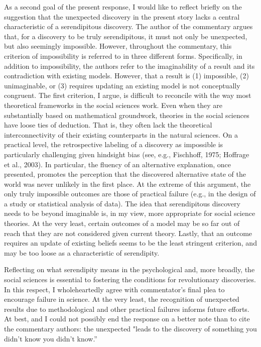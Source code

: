 \documentclass[authordate, commentary]{jote-new-article}
\begin{document}
	As a second goal of the present response, I would like to reflect briefly on the suggestion that the unexpected discovery in the present story lacks a central characteristic of a serendipitous discovery. The author of the commentary argues that, for a discovery to be truly serendipitous, it must not only be unexpected, but also seemingly impossible. However, throughout the commentary, this criterion of impossibility is referred to in three different forms. Specifically, in addition to impossibility, the authors refer to the imaginability of a result and its contradiction with existing models. However, that a result is (1) impossible, (2) unimaginable, or (3) requires updating an existing model is not conceptually congruent. The first criterion, I argue, is difficult to reconcile with the way most theoretical frameworks in the social sciences work. Even when they are substantially based on mathematical groundwork, theories in the social sciences have loose ties of deduction. That is, they often lack the theoretical interconnectivity of their existing counterparts in the natural sciences. On a practical level, the retrospective labeling of a discovery as impossible is particularly challenging given hindsight bias (see, e.g., Fischhoff, 1975; Hoffrage et al., 2003). In particular, the fluency of an alternative explanation, once presented, promotes the perception that the discovered alternative state of the world was never unlikely in the first place. At the extreme of this argument, the only truly impossible outcomes are those of practical failure (e.g., in the design of a study or statistical analysis of data). The idea that serendipitous discovery needs to be beyond imaginable is, in my view, more appropriate for social science theories. At the very least, certain outcomes of a model may be so far out of reach that they are not considered given current theory. Lastly, that an outcome requires an update of existing beliefs seems to be the least stringent criterion, and may be too loose as a characteristic of serendipity.



	Reflecting on what serendipity means in the psychological and, more broadly, the social sciences is essential to fostering the conditions for revolutionary discoveries. In this respect, I wholeheartedly agree with commentator's final plea to encourage failure in science. At the very least, the recognition of unexpected results due to methodological and other practical failures informs future efforts. At best, and I could not possibly end the response on a better note than to cite the commentary authors: the unexpected "leads to the discovery of something you didn't know you didn't know.”
\end{document}
